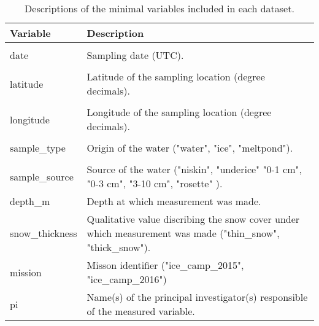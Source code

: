 \begin{table}[]
	\centering
	\begin{tabular}{l L{12cm}}
		\toprule
		\textbf{Variable} & \textbf{Description}                                                                                        \\
		\toprule                                                                                                                        \\
		date              & Sampling date (UTC).                                                                                        \\
		\hline                                                                                                                          \\
		latitude          & Latitude of the sampling location (degree decimals).                                                        \\
		\hline                                                                                                                          \\
		longitude         & Longitude of the sampling location (degree decimals).                                                       \\
		\hline                                                                                                                          \\
		sample\_type      & Origin of the water ("water", "ice", "meltpond").                                                           \\
		\hline                                                                                                                          \\
		sample\_source    & Source of the water ("niskin", "underice" "0-1 cm", "0-3 cm", "3-10 cm", "rosette" ).                       \\
		\hline
		depth\_m          & Depth at which measurement was made.                                                                        \\
		\hline
		snow\_thickness   & Qualitative value discribing the snow cover under which measurement was made ("thin\_snow", "thick\_snow"). \\
		\hline
		mission           & Misson identifier ("ice\_camp\_2015", "ice\_camp\_2016")                                                    \\
		\hline
		pi                & Name(s) of the principal investigator(s) responsible of the measured variable.                              \\
		\bottomrule
	\end{tabular}
	\caption{Descriptions of the minimal variables included in each dataset.}
\end{table}
